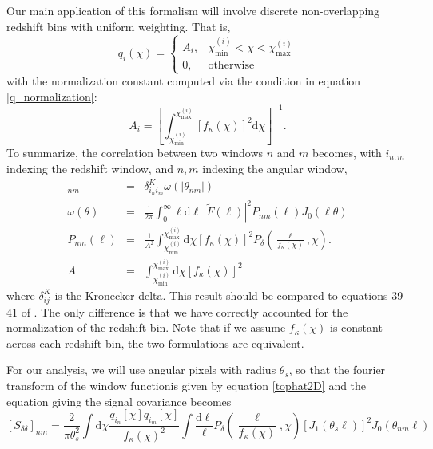 \documentclass[12pt,preprint]{aastex}			%
\newcommand{\rcom}{\chi}
\newcommand{\dd}{\mathrm{d}}
\begin{document}
Our main application of this formalism will involve discrete 
non-overlapping redshift bins with uniform weighting.  That is,
\begin{equation}
  q_i(\rcom) = \left\{
  \begin{array}{ll}
    A_i, & \rcom^{(i)}_{\mathrm{min}} 
    < \rcom < \rcom^{(i)}_{\mathrm{max}}\\
    0, & \mathrm{otherwise}
  \end{array}
  \right.
\end{equation}
with the normalization constant computed via the condition in equation 
\ref{q_normalization}:
\begin{equation}
  A_i = \left[\int_{\rcom^{(i)}_{\mathrm{min}}}^{\rcom^{(i)}_{\mathrm{max}}}
  [f_\kappa(\rcom)]^2 \dd\rcom\right]^{-1}.
\end{equation}
To summarize, the correlation between two windows $n$ 
and $m$ becomes, with $i_{n,m}$
indexing the redshift window, and $n,m$ indexing the angular window,
\begin{eqnarray}
  [S_{\delta\delta}]_{nm} 
  &=& \delta^K_{i_ni_m}\omega(|\theta_{nm}|)\nonumber\\
  \omega(\theta)
  &=&\frac{1}{2\pi}\int_0^\infty\ell\dd\ell\, 
  |\widetilde{F}(\ell)|^2
  P_{nm}(\ell)J_0(\ell\theta)\nonumber\\
  P_{nm}(\ell) &=& 
  \frac{1}{A^2}
  \int_{\rcom^{(i)}_\mathrm{min}}^{\rcom^{(i)}_\mathrm{max}} 
  \dd\rcom \left[f_\kappa(\rcom)\right]^2
  P_\delta\left(\frac{\ell}{f_\kappa(\rcom)},\rcom\right).\nonumber\\
  A &=& \int_{\rcom^{(i)}_\mathrm{min}}^{\rcom^{(i)}_\mathrm{max}} 
  \dd\rcom \left[f_\kappa(\rcom)\right]^2
\end{eqnarray} 
where $\delta^K_{ij}$ is the Kronecker delta. This result should be 
compared  to equations 39-41 of \citet{Simon09}.  The only difference is
that we have correctly accounted for the normalization of the redshift
bin.  Note that if we assume $f_\kappa(\rcom)$ is constant across
each redshift bin, the two formulations are equivalent.

For our analysis, we will use angular pixels with radius $\theta_s$, 
so that the fourier transform of the window functionis given by equation 
\ref{tophat2D} and the equation giving the signal covariance becomes
\begin{equation}
  \left[S_{\delta\delta}\right]_{nm}
  = \frac{2}{\pi\theta_s^2} 
  \int \dd\rcom \frac{q_{i_n}[\rcom]q_{i_m}[\rcom]}
  {f_\kappa(\rcom)^2} 
  \int  \frac{\dd\ell}{\ell}
  P_\delta\left(\frac{\ell}{f_\kappa(\rcom)},\rcom\right)
  [J_1(\theta_s\ell)]^2 J_0(\theta_{nm}\ell)
\end{equation}
\end{document}
